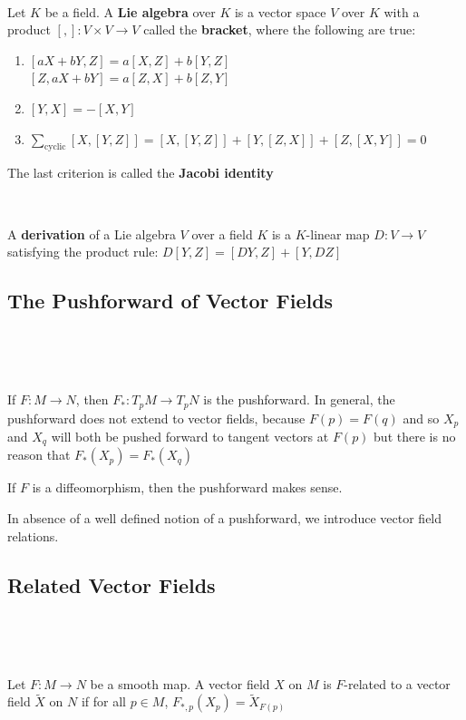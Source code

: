 \documentclass{article}
\begin{document}
\begin{definition}
  \

  Let $K$ be a field. A \textbf{Lie algebra} over $K$ is a vector space $V$ over $K$ with a product $[,]: V \times V\to V$ called the \textbf{bracket}, where the following are true:

  \begin{enumerate}
    \item $[aX + bY, Z] = a[X,Z] + b[Y,Z]$ \\ $[Z, aX + bY] = a[Z,X] + b[Z,Y]$
    \item $[Y,X] = -[X,Y]$
    \item $\sum_\text{cyclic}[X,[Y,Z]] = [X,[Y,Z]] + [Y, [Z,X]] + [Z, [X,Y]] = 0$
  \end{enumerate}The last criterion is called the \textbf{Jacobi identity}
\end{definition}

\begin{definition}
  \

  A \textbf{derivation} of a Lie algebra $V$ over a field $K$ is a $K$-linear map $D: V \to V$ satisfying the product rule: $D[Y,Z] = [DY,Z] + [Y,DZ]$
\end{definition}

\subsection{The Pushforward of Vector Fields}
\

\begin{remark}
  \

  If $F: M \to N$, then $F_*: T_pM \to T_pN$ is the pushforward. In general, the pushforward does not extend to vector fields, because $F(p) = F(q)$ and so $X_p$ and $X_q$ will both be pushed forward to tangent vectors at $F(p)$ but there is no reason that $F_*(X_p) = F_*(X_q)$

  If $F$ is a diffeomorphism, then the pushforward makes sense.

  In absence of a well defined notion of a pushforward, we introduce vector field relations.
\end{remark}

\subsection{Related Vector Fields}
\

\begin{definition}[$F$-related]
  \

  Let $F: M \to N$ be a smooth map. A vector field $X$ on $M$ is $F$-related to a vector field $\tilde{X}$ on $N$ if for all $p \in M$, $F_{*, p}(X_p) = \tilde{X}_{F(p)}$
\end{definition}
\end{document}
